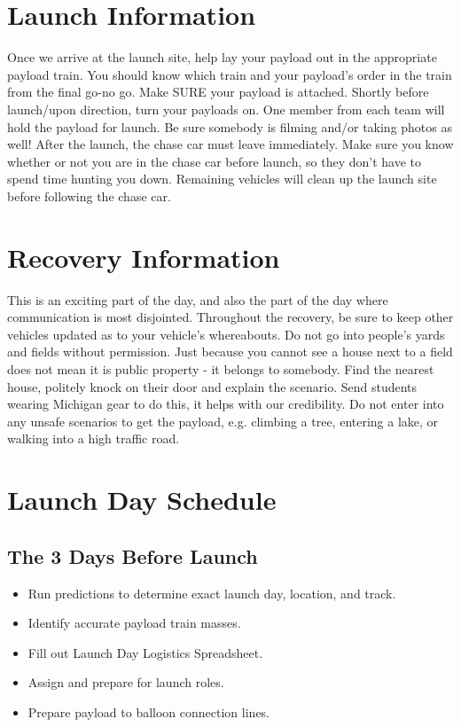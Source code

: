 \documentclass[12pt]{article}
\begin{document}
	\section*{Launch Information}
	Once we arrive at the launch site, help lay your payload out in the appropriate payload train. You should know which train and your payload's order in the train from the final go-no go. Make SURE your payload is attached. Shortly before launch/upon direction, turn your payloads on. One member from each team will hold the payload for launch. Be sure somebody is filming and/or taking photos as well! After the launch, the chase car must leave immediately. Make sure you know whether or not you are in the chase car before launch, so they don't have to spend time hunting you down. Remaining vehicles will clean up the launch site before following the chase car.
	
	\section*{Recovery Information}
	This is an exciting part of the day, and also the part of the day where communication is most disjointed. Throughout the recovery, be sure to keep other vehicles updated as to your vehicle's whereabouts.
	Do not go into people's yards and fields without permission. Just because you cannot see a house next to a field does not mean it is public property - it belongs to somebody. Find the nearest house, politely knock on their door and explain the scenario. Send students wearing Michigan gear to do this, it helps with our credibility. Do not enter into any unsafe scenarios to get the payload, e.g. climbing a tree, entering a lake, or walking into a high traffic road.
	
	\section*{Launch Day Schedule}
	\subsection*{The 3 Days Before Launch}
	\begin{itemize}
	    \item Run predictions to determine exact launch day, location,  and track.
	    \item Identify accurate payload train masses.
	    \item Fill out Launch Day Logistics Spreadsheet.
	    \item Assign and prepare for launch roles.
	    \item Prepare payload to balloon connection lines.
	\end{itemize}
	
\end{document}
